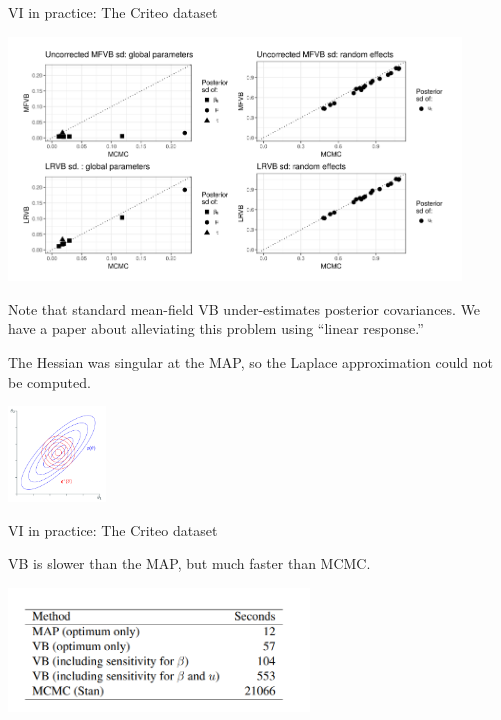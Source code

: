 \begin{frame}{VI in practice: The Criteo dataset}

\begin{center}
\includegraphics[width=0.9\textwidth]{static_images/Criteo_model_sds.png}
\end{center}


\begin{minipage}{0.6\textwidth}
%
Note that standard mean-field VB under-estimates posterior covariances.
We have a paper about alleviating this problem using
``linear response.''
\citep{giordano2018covariances}

\vspace{1em}
The Hessian was singular at the MAP, so the Laplace approximation
could not be computed.

%
\end{minipage}
%
\begin{minipage}{0.3\textwidth}
\begin{center}
    \includegraphics[height=1in]{static_images/mfvb_example.png}
\end{center}
\end{minipage}


\end{frame}


\begin{frame}{VI in practice: The Criteo dataset}

\begin{center}
VB is slower than the MAP, but much faster than MCMC.

\includegraphics[width=0.6\textwidth]{static_images/Criteo_timing.png}
\end{center}

\end{frame}



